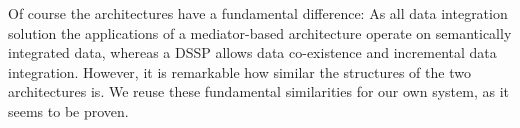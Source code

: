 Of course the architectures have a fundamental difference: As all data integration solution the applications of a mediator-based architecture operate on semantically integrated data, whereas a DSSP allows data co-existence and incremental data integration.
However, it is remarkable how similar the structures of the two architectures is. We reuse these fundamental similarities for our own system, as it seems to be proven.